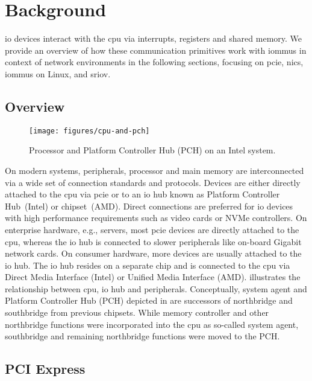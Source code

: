 \chapter{Background}
\label{chap:background}

\Ac{io} devices interact with the \acs{cpu} via interrupts, registers and shared
memory. We provide an overview of how these communication primitives work with
\acp{iommu} in context of network environments in the following sections,
focusing on \acs{pcie}, \acsp{nic}, \acsp{iommu} on Linux, and \acs{sriov}.


\section{Overview}
\label{sec:overview}

\begin{figure}[!b]
    \centering
    \texttt{[image: figures/cpu-and-pch]}
    \caption{Processor and Platform Controller Hub (PCH) on an Intel system.}
    \label{fig:pch}
\end{figure}

On modern systems, peripherals, processor and main memory are interconnected via
a wide set of connection standards and protocols. Devices are either directly
attached to the \ac{cpu} via \ac{pcie} or to an \acs{io} hub known as Platform
Controller Hub~(Intel) or chipset~(AMD). Direct connections are preferred for
\ac{io} devices with high performance requirements such as video cards or NVMe
controllers. On enterprise hardware, e.g., servers, most \ac{pcie} devices are
directly attached to the \ac{cpu}, whereas the \ac{io} hub is connected to
slower peripherals like on-board Gigabit network cards. On consumer hardware,
more devices are usually attached to the \ac{io} hub. The \ac{io} hub resides on
a separate chip and is connected to the \ac{cpu} via Direct Media Interface
(Intel) or Unified Media Interface (AMD).  illustrates the
relationship between \ac{cpu}, \ac{io} hub and peripherals. Conceptually, system
agent and Platform Controller Hub (PCH) depicted in  are
successors of northbridge and southbridge from previous chipsets. While memory
controller and other northbridge functions were incorporated into the \ac{cpu}
as so-called system agent, southbridge and remaining northbridge functions were
moved to the PCH.


\section{PCI Express}
\label{sec:pcie}

